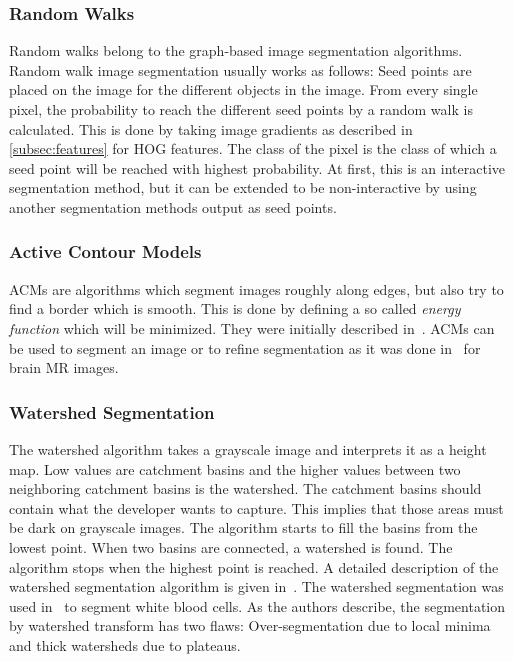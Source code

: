 \documentclass[technote,a4paper,leqno]{IEEEtran}
\begin{document}
\subsubsection{Random Walks}
Random walks belong to the graph-based image segmentation algorithms. Random
walk image segmentation usually works as follows: Seed points are placed
on the image for the different objects in the image. From every single pixel,
the probability to reach the different seed points by a random walk is
calculated. This is done by taking image gradients as described in
\cref{subsec:features} for \gls{HOG} features. The class of the pixel is the
class of which a seed point will be reached with highest probability. At first,
this is an interactive segmentation method, but it can be extended to be
non-interactive by using another segmentation methods output as seed points.
\subsubsection{Active Contour Models}
\Glspl{ACM} are algorithms which segment images roughly along edges, but also
try to find a border which is smooth. This is done by defining a so called
\textit{energy function} which will be minimized. They were initially
described in~\cite{kass1988snakes}. \Glspl{ACM} can be used to segment an image
or to refine segmentation as it was done in~\cite{atkins1998fully} for brain
\gls{MR} images.
\subsubsection{Watershed Segmentation}\label{subsec:watershed}
The watershed algorithm takes a grayscale image and interprets it as a height
map. Low values are catchment basins and the higher values between two
neighboring catchment basins is the watershed. The catchment basins should
contain what the developer wants to capture. This implies that those areas
must be dark on grayscale images. The algorithm starts to fill the basins from
the lowest point. When two basins are connected, a watershed is found. The
algorithm stops when the highest point is reached.
A detailed description of the watershed segmentation algorithm is given
in~\cite{roerdink2000watershed}.
The watershed segmentation was used in~\cite{1260033} to segment white blood
cells. As the authors describe, the segmentation by watershed transform has
two flaws: Over-segmentation due to local minima and thick watersheds due to
plateaus.
\end{document}

